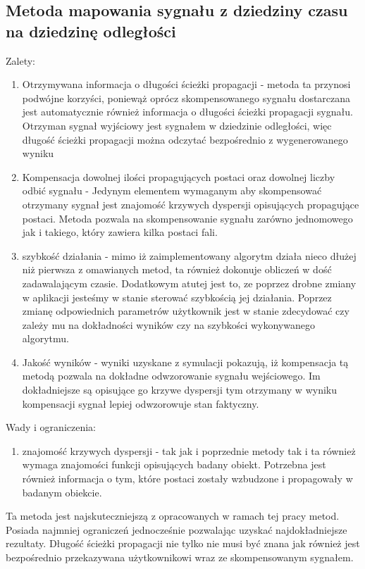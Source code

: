 \subsection{Metoda mapowania sygnału z dziedziny czasu na dziedzinę odległości}
Zalety:
\begin{enumerate}
\item Otrzymywana informacja o długości ścieżki propagacji - metoda ta przynosi podwójne korzyści, poniewąż oprócz skompensowanego sygnału dostarczana jest automatycznie również informacja o długości ścieżki propagacji sygnału. Otrzyman sygnał wyjściowy jest sygnałem w dziedzinie odległości, więc długość ścieżki propagacji można odczytać bezpośrednio z wygenerowanego wyniku
\item Kompensacja dowolnej ilości propagujących postaci oraz dowolnej liczby odbić sygnału - Jedynym elementem wymaganym aby skompensować otrzymany sygnał jest znajomość krzywych dyspersji opisujących propagujące postaci. Metoda pozwala na skompensowanie sygnału zarówno jednomowego jak i takiego, który zawiera kilka postaci fali.
\item szybkość działania - mimo iż zaimplementowany algorytm działa nieco dłużej niż pierwsza z omawianych metod, ta również dokonuje obliczeń w dość zadawalającym czasie. Dodatkowym atutej jest to, ze poprzez drobne zmiany w aplikacji jesteśmy w stanie sterować szybkością jej działania. Poprzez zmianę odpowiednich parametrów użytkownik jest w stanie zdecydować czy zależy mu na dokładności wyników czy na szybkości wykonywanego algorytmu.
\item Jakość wyników - wyniki uzyskane z symulacji pokazują, iż kompensacja tą metodą pozwala na dokładne odwzorowanie sygnału wejściowego. Im dokładniejsze są opisujące go krzywe dyspersji tym otrzymany w wyniku kompensacji sygnał lepiej odwzorowuje stan faktyczny.
\end{enumerate}
Wady i ograniczenia:
\begin{enumerate}
\item znajomość krzywych dyspersji - tak jak i poprzednie metody tak i ta również wymaga znajomości funkcji opisujących badany obiekt. Potrzebna jest również informacja o tym, które postaci zostały wzbudzone i propagowały w badanym obiekcie.
\end{enumerate}
Ta metoda jest najskuteczniejszą z opracowanych w ramach tej pracy metod. Posiada najmniej ograniczeń jednocześnie pozwalając uzyskać najdokładniejsze rezultaty. Długość ścieżki propagacji nie tylko nie musi być znana jak również jest bezpośrednio przekazywana użytkownikowi wraz ze skompensowanym sygnałem.